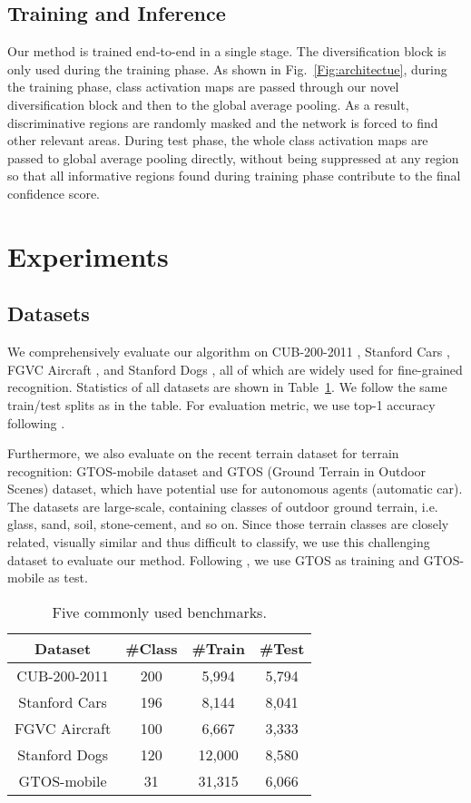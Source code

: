 \documentclass[letterpaper]{article} \usepackage{aaai20}  \usepackage{times}  \usepackage{helvet} \usepackage{courier}  \usepackage[hyphens]{url}  \usepackage{graphicx} \usepackage{multirow}
\begin{document}
\subsection{Training and Inference}
Our method is trained end-to-end in a single stage. The diversification block is only used during the training phase. As shown in Fig.~\ref{Fig:architectue}, during the training phase, class activation maps are passed through our novel diversification block and then to the global average pooling. As a result, discriminative regions are randomly masked and the network is forced to find other relevant areas. During test phase, the whole class activation maps are passed to global average pooling directly, without being suppressed at any region so that all informative regions found during training phase contribute to the final confidence score.

\section{Experiments}
\subsection{Datasets}
We comprehensively evaluate our algorithm on CUB-200-2011 \cite{dataset_cub}, Stanford Cars \cite{dataset_cars}, FGVC Aircraft \cite{dataset_aircraft}, and Stanford Dogs \cite{dataset_dogs}, all of which are widely used for fine-grained recognition. Statistics of all datasets are shown in Table~\ref{tab:dataset}. We follow the same train/test splits as in the table. For evaluation metric, we use top-1 accuracy following \cite{mamc_2018,pc_2018,max_entropy}.

Furthermore, we also evaluate on the recent terrain dataset for terrain recognition: GTOS-mobile \cite{dataset_gtosmobile} dataset and GTOS (Ground Terrain in Outdoor Scenes) \cite{dataset_gtos} dataset, which have potential use for autonomous agents (automatic car). The datasets are large-scale, containing classes of outdoor ground terrain, i.e. glass, sand, soil, stone-cement, and so on. Since those terrain classes are closely related, visually similar and thus difficult to classify, we use this challenging dataset to evaluate our method. Following \cite{dataset_gtosmobile}, we use GTOS as training and GTOS-mobile as test.
\begin{table}[h]
\centering
\begin{tabular}{|c|c|c|c|}
\hline
Dataset        & \#Class & \#Train & \#Test \\ \hline\hline
CUB-200-2011  & 200     & 5,994    & 5,794   \\ \hline
Stanford Cars  & 196     & 8,144    & 8,041   \\ \hline
FGVC Aircraft  & 100     & 6,667    & 3,333   \\ \hline
Stanford Dogs  & 120     & 12,000    & 8,580   \\ \hline
GTOS-mobile & 31     & 31,315    & 6,066   \\ \hline
\end{tabular}
\caption{Five commonly used benchmarks.}
\label{tab:dataset}
\end{table}
\end{document}
